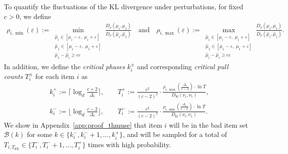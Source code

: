 \documentclass[twoside,11pt]{article}
\newcommand{\kl}{D_{\mathrm{kl}}}
\newcommand{\calB}{\mathcal{B}}
\newcommand{\Tfe}{T_{\mathrm{FE}}}
\newcommand{\klnu}{D_{\nu}}
\begin{document}
To quantify the fluctuations of the KL divergence under perturbations, for fixed $c>0$, we define 
\begin{align}
    \rho_{i,\min}(\varepsilon) := 
        \min_{\substack{
            \hat\mu_i \in [\mu_i-\varepsilon,\;\mu_i+\varepsilon] \\
            \hat\mu_1 \in [\mu_1-\varepsilon,\;\mu_1+\varepsilon] \\
            \hat\mu_1-\hat\mu_i\geq c\varepsilon
            }}
            \frac{\klnu(\mu_i,\mu_1)}{\klnu(\hat\mu_i,\hat\mu_1)}
    \quad\mbox{and}\quad
     \rho_{i,\max}(\varepsilon) := 
             \max_{\substack{
                 \hat\mu_i \in [\mu_i-\varepsilon,\;\mu_i+\varepsilon] \\
                 \hat\mu_1 \in [\mu_1-\varepsilon,\;\mu_1+\varepsilon] \\
                 \hat\mu_i-\hat\mu_i \geq c\varepsilon
                 }}
                 \frac{\klnu(\mu_i,\mu_1)}{\klnu(\hat\mu_i,\hat\mu_1)}.
\end{align}
In addition, we define the \emph{critical phases} $k_i^{\pm}$ and corresponding \emph{critical pull counts} $T_i^\pm$ for each item $i$ as
\begin{align}
    &k_i^+ :=\Big\lceil\log_d \frac{c+2}{\Delta_{i}}\Big\rceil  ,\qquad
    T_i^+ := \frac{c^2}{(c-2)^2}\cdot\frac{ \rho_{i,\max}(\frac{\Delta_i}{c-2})\cdot\ln T}{\kl(\nu_i,\nu_1)},
    \\
    &k_i^- :=  \Big\lfloor\log_d \frac{c-2}{\Delta_{i}}\Big\rfloor,\qquad
    T_i^- :=\frac{c^2}{(c-2)^2}\cdot\frac{\rho_{i,\min}(\frac{\Delta_i}{c-2})\cdot \ln T}{\kl(\nu_i,\nu_1)} .
\end{align}
We show in Appendix~\ref{app:proof_thmuse} that item $i$ will be in the bad item set $\calB(k)$ for some $k\in \{k_i^-,k_i^-+1,\ldots, k_i^+\}$, and  will be sampled for a total of $T_{i,\Tfe}\in\{T_i^-,T_i^-+1,\ldots, T_i^+\}$ times with high probability.
\end{document}
